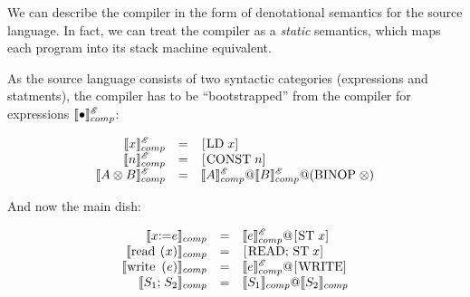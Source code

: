 We can describe the compiler in the form of denotational semantics for the source language. In fact, we can treat the compiler as a \emph{static} semantics, which
maps each program into its stack machine equivalent.

As the source language consists of two syntactic categories (expressions and statments), the compiler has to be ``bootstrapped'' from the compiler for expressions
$\llbracket{\bullet}\rrbracket^{\mathscr E}_{comp}$:

\[
\begin{array}{rcl}
  \sembr{x}^{\mathscr E}_{comp}&=&\llang{[LD $\;x$]}\\
  \sembr{n}^{\mathscr E}_{comp}&=&\llang{[CONST $\;n$]}\\
  \sembr{A\otimes B}^{\mathscr E}_{comp}&=&\sembr{A}^{\mathscr E}_{comp}\llang{@}\sembr{B}^{\mathscr E}_{comp}\llang{@}(\llang{BINOP $\;\otimes$})
\end{array}
\]

And now the main dish:

\[
\begin{array}{rcl}
  \sembr{\llang{$x$ := $e$}}_{comp}&=&\sembr{e}^{\mathscr E}_{comp}\llang{@}\llang{[ST $\;x$]}\\
  \sembr{\llang{read ($x$)}}_{comp}&=&\llang{[READ; ST $\;x$]}\\
  \sembr{\llang{write ($e$)}}_{comp}&=&\sembr{e}^{\mathscr E}_{comp}\llang{@}\llang{[WRITE]}\\
  \sembr{\llang{$S_1$;$\;S_2$}}_{comp}&=&\sembr{S_1}_{comp}\llang{@}\sembr{S_2}_{comp}
\end{array}
\]
